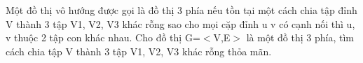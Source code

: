 Một đồ thị vô hướng được gọi là đồ thị 3 phía nếu tồn tại một cách chia tập đỉnh V thành 3 tập V1, V2, V3 khác rỗng sao cho mọi cặp đỉnh u v có cạnh nối thì u, v thuộc 2 tập con khác nhau. Cho đồ thị G=$<$V,E$>$ là một đồ thị 3 phía, tìm cách chia tập V thành 3 tập V1, V2, V3 khác rỗng thỏa mãn.
